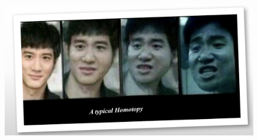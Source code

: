 \begin{figure}[H]
\centering
\includegraphics[width=\textwidth]{week9/p_4}
\end{figure}















